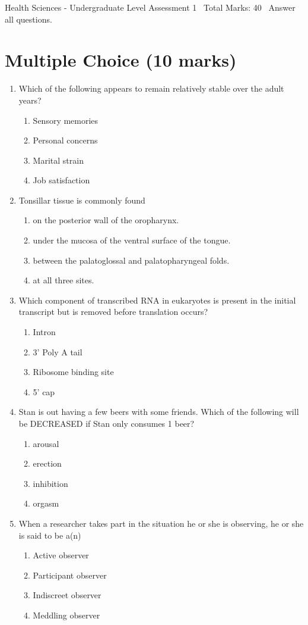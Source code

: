 \documentclass[12pt]{article}
\begin{document}
\begin{center}
Health Sciences - Undergraduate Level Assessment 1 \
Total Marks: 40 \
Answer all questions.
\end{center}

\section*{Multiple Choice (10 marks)}
\begin{enumerate}[label=\arabic*.]
\item Which of the following appears to remain relatively stable over the adult years?
\begin{enumerate}[label=(\alph*)]
    \item Sensory memories
    \item Personal concerns
    \item Marital strain
    \item Job satisfaction
\end{enumerate}
\item Tonsillar tissue is commonly found
\begin{enumerate}[label=(\alph*)]
    \item on the posterior wall of the oropharynx.
    \item under the mucosa of the ventral surface of the tongue.
    \item between the palatoglossal and palatopharyngeal folds.
    \item at all three sites.
\end{enumerate}
\item Which component of transcribed RNA in eukaryotes is present in the initial transcript but is removed before translation occurs?
\begin{enumerate}[label=(\alph*)]
    \item Intron
    \item 3' Poly A tail
    \item Ribosome binding site
    \item 5' cap
\end{enumerate}
\item Stan is out having a few beers with some friends. Which of the following will be DECREASED if Stan only consumes 1 beer?
\begin{enumerate}[label=(\alph*)]
    \item arousal
    \item erection
    \item inhibition
    \item orgasm
\end{enumerate}
\item When a researcher takes part in the situation he or she is observing, he or she is said to be a(n)
\begin{enumerate}[label=(\alph*)]
    \item Active observer
    \item Participant observer
    \item Indiscreet observer
    \item Meddling observer
\end{enumerate}
\end{enumerate}
\end{document}
